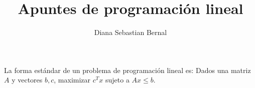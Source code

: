 \documentclass{article}
\title{Apuntes de programación lineal}
\author{Diana Sebastian Bernal}
\begin{document}
\maketitle

La forma estándar de un problema de programación lineal es: Dados una
matriz $A$ y vectores $b,c$, maximizar $c^Tx$ sujeto a $Ax\leq b$.
\end{document}
